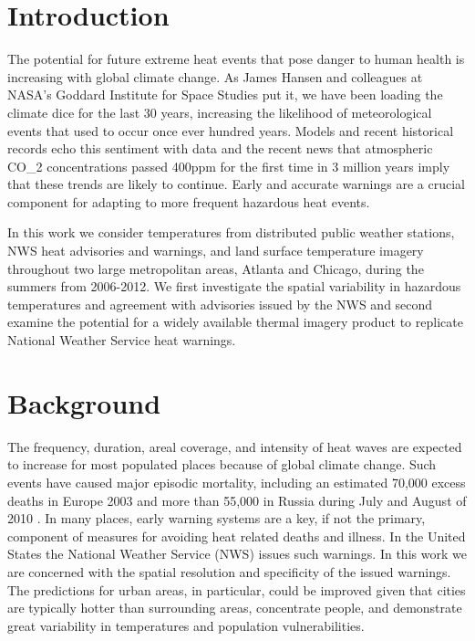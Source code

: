 \documentclass[twocol]{ametsoc}
\begin{document}
\section{Introduction}\label{section:intro}
The potential for future extreme heat events that pose danger to human health is increasing with global climate change. As James Hansen and colleagues at NASA's Goddard Institute for Space Studies put it, we have been loading the climate dice for the last 30 years, increasing the likelihood of meteorological events that used to occur once ever hundred years. Models and recent historical records echo this sentiment with data and the recent news that atmospheric CO\_{2} concentrations passed 400ppm for the first time in 3 million years imply that these trends are likely to continue.  Early and accurate warnings are a crucial component for adapting to more frequent hazardous heat events.

In this work we consider temperatures from distributed public weather stations, NWS heat advisories and warnings, and land surface temperature imagery throughout two large metropolitan areas, Atlanta and Chicago, during the summers from 2006-2012. We first investigate the spatial variability in hazardous temperatures and agreement with advisories issued by the NWS and second examine the potential for a widely available thermal imagery product to replicate National Weather Service heat warnings.

\section{Background} \label{section:background}
The frequency, duration, areal coverage, and intensity of heat waves are expected to increase for most populated places because of global climate change\citep{Meehl2004,Easterling2000}. Such events have caused major episodic mortality, including an estimated 70,000 excess deaths in Europe 2003 \citep{Robine2008} and more than 55,000 in Russia during July and August of 2010 \citep{Guha2011,Revich2011}. In many places, early warning systems are a key, if not the primary, component of measures for avoiding heat related deaths and illness. In the United States the National Weather Service (NWS) issues such warnings. In this work we are concerned with the spatial resolution and specificity of the issued warnings. The predictions for urban areas, in particular, could be improved given that cities are typically hotter than surrounding areas, concentrate people, and demonstrate great variability in temperatures and population vulnerabilities.
\end{document}
